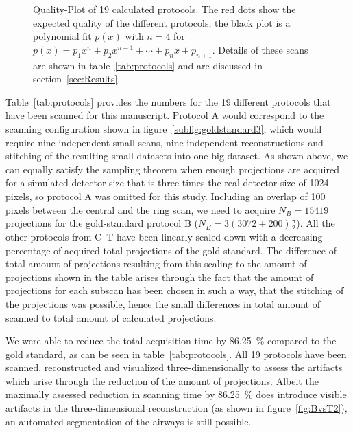 \begin{figure*}[htp]
	\centering%
	\caption[Quality-Plot of 19 calculated protocols.]{Quality-Plot of 19 calculated protocols. The red dots show the expected quality of the different protocols, the black plot is a polynomial fit $p(x)$ with $n=4$ for $p(x)=p_{1}x^{n}+p_{2}x^{n-1}+\cdots+p_{n}x+p_{n+1}$. Details of these scans are shown in table~\ref{tab:protocols} and are discussed in section~\ref{sec:Results}.}%
	\label{fig:qualityplot}%
\end{figure*}

\cbstart
Table~\ref{tab:protocols} provides the numbers for the 19 different protocols that have been scanned for this manuscript. Protocol A would correspond to the scanning configuration shown in figure~\ref{subfig:goldstandard3}, which would require nine independent small scans, nine independent reconstructions and stitching of the resulting small datasets into one big dataset. As shown above, we can equally satisfy the sampling theorem when enough projections are acquired for a simulated detector size that is three times the real detector size of 1024 pixels, so protocol A was omitted for this study. Including an overlap of 100 pixels between the central and the ring scan, we need to acquire $N_{B}=15419$ projections for the gold-standard protocol B ($N_{B}=3(3072+200)\frac{\pi}{2}$). All the other protocols from C--T have been linearly scaled down with a decreasing percentage of acquired total projections of the gold standard. The difference of total amount of projections resulting from this scaling to the amount of projections shown in the table arises through the fact that the amount of projections for each subscan has been chosen in such a way, that the stitching of the projections was possible, hence the small differences in total amount of scanned to total amount of calculated projections.

We were able to reduce the total acquisition time by \SI{86.25}{\percent} compared to the gold standard, as can be seen in table~\ref{tab:protocols}. All 19 protocols have been scanned, reconstructed and visualized three-dimensionally to assess the artifacts which arise through the reduction of the amount of projections. Albeit the maximally assessed reduction in scanning time by \SI{86.25}{\percent} does introduce visible artifacts in the three-dimensional reconstruction (as shown in figure~\ref{fig:BvsT2}), an automated segmentation of the airways is still possible.
\cbend

